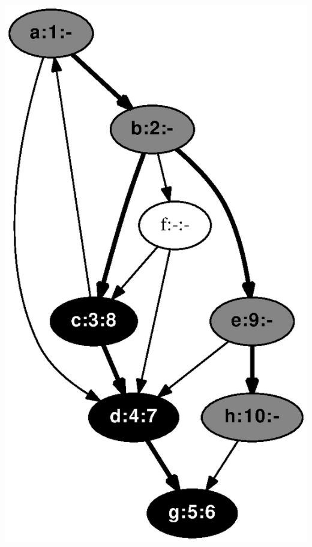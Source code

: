 \documentclass{article}
\begin{document}
\includegraphics[height=.3\textheight]{dfs_directed_classroom_10.eps}
\vspace{1em}
\end{document}
